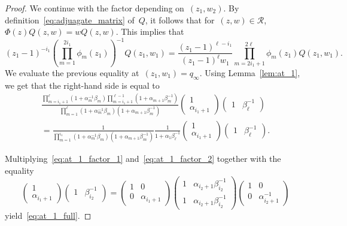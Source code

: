 \documentclass[11pt]{article}
\theoremstyle{plain}
\theoremstyle{definition}
\numberwithin{equation}{section}
\begin{document}
\begin{proof}
We continue with the factor depending on~$(z_1,w_2)$. By definition~\eqref{eq:adjuagate_matrix} of~$Q$, it follows that for~$(z,w)\in \mathcal R$,~$\Phi(z)Q(z,w)=wQ(z,w)$. This implies that
\begin{equation}
(z_1-1)^{-i_1}\left(\prod_{m=1}^{2i_1}\phi_m(z_1)\right)^{-1}Q(z_1,w_1)
=\frac{(z_1-1)^{\ell-i_1}}{(z_1-1)^\ell w_1}\prod_{m=2i_1+1}^{2\ell}\phi_m(z_1)Q(z_1,w_1).
\end{equation}
We evaluate the previous equality at~$(z_1,w_1)=q_\infty$. Using Lemma~\ref{lem:at_1}, we get that the right-hand side is equal to
\begin{multline}\label{eq:at_1_factor_2}
\frac{\prod_{m=i_1+1}^\ell(1+\alpha_m^{-1}\beta_m)\prod_{m=i_1+1}^{\ell-1}(1+\alpha_{m+1}\beta_m^{-1})}
{\prod_{m=1}^\ell(1+\alpha_m^{-1}\beta_m)(1+\alpha_{m+1}\beta_m^{-1})}
\begin{pmatrix}
1 \\
\alpha_{i_1+1}
\end{pmatrix}
\begin{pmatrix}
1 & \beta_\ell^{-1}
\end{pmatrix} \\
=
\frac{1}{\prod_{m=1}^{i_1}(1+\alpha_m^{-1}\beta_m)(1+\alpha_{m+1}\beta_m^{-1})}\frac{1}{1+\alpha_1\beta_\ell^{-1}}
\begin{pmatrix}
1 \\
\alpha_{i_1+1}
\end{pmatrix}
\begin{pmatrix}
1 & \beta_\ell^{-1}
\end{pmatrix}.
\end{multline}

Multiplying~\eqref{eq:at_1_factor_1} and~\eqref{eq:at_1_factor_2} together with the equality 
\begin{equation}
\begin{pmatrix}
1 \\
\alpha_{i_1+1}
\end{pmatrix}
\begin{pmatrix}
1 & \beta_{i_2}^{-1}
\end{pmatrix}
=
\begin{pmatrix}
1 & 0 \\
0 & \alpha_{i_1+1}
\end{pmatrix}
\begin{pmatrix}
1 & \alpha_{i_2+1}\beta_{i_2}^{-1} \\
1 & \alpha_{i_2+1}\beta_{i_2}^{-1}
\end{pmatrix}
\begin{pmatrix}
1 & 0 \\
0 & \alpha_{i_2+1}^{-1}
\end{pmatrix}
\end{equation}
yield~\eqref{eq:at_1_full}.
\end{proof}
\end{document}
